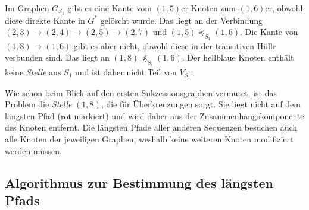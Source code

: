 \begin{center}
\end{center}

\vspace{-5pt}

Im Graphen $G_{S_1}$ gibt es eine Kante vom $(1,5)$er-Knoten zum $(1,6)$er, obwohl diese direkte Kante in $G^{*}$ gelöscht wurde. Das liegt an der Verbindung $(2,3) \rightarrow (2,4) \rightarrow (2,5) \rightarrow (2,7)$ und $(1,5) \preceq_{S_1} (1,6)$. Die Kante von $(1,8) \rightarrow (1,6)$ gibt es aber nicht, obwohl diese in der transitiven Hülle verbunden sind. Das liegt an $(1,8) \npreceq_{S_i} (1,6)$. Der hellblaue Knoten enthält keine \emph{Stelle} aus $S_1$ und ist daher nicht Teil von $V_{S_1}$.

Wie schon beim Blick auf den ersten Sukzessionsgraphen vermutet, ist das Problem die \emph{Stelle} $(1,8)$, die für Überkreuzungen sorgt. Sie liegt nicht auf dem längsten Pfad (rot markiert) und wird daher aus der Zusammenhangskomponente des Knoten entfernt. Die längsten Pfade aller anderen Sequenzen besuchen auch alle Knoten der jeweiligen Graphen, weshalb keine weiteren Knoten modifiziert werden müssen.

\subsection{Algorithmus zur Bestimmung des längsten Pfads}

